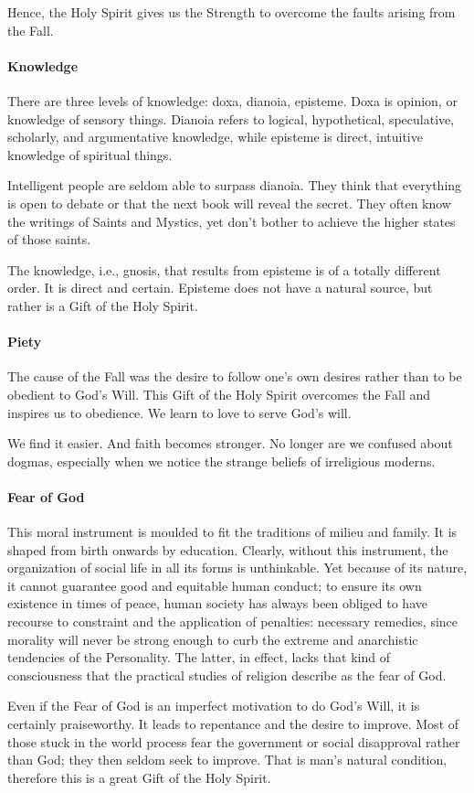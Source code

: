 Hence, the Holy Spirit gives us the Strength to overcome the faults arising from the Fall.

\paragraph{Knowledge}
There are three levels of knowledge: doxa, dianoia, episteme. Doxa is opinion, or knowledge of sensory things. Dianoia refers to logical, hypothetical, speculative, scholarly, and argumentative knowledge, while episteme is direct, intuitive knowledge of spiritual things.

Intelligent people are seldom able to surpass dianoia. They think that everything is open to debate or that the next book will reveal the secret. They often know the writings of Saints and Mystics, yet don't bother to achieve the higher states of those saints.

The knowledge, i.e., gnosis, that results from episteme is of a totally different order. It is direct and certain. Episteme does not have a natural source, but rather is a Gift of the Holy Spirit.

\paragraph{Piety}
The cause of the Fall was the desire to follow one's own desires rather than to be obedient to God's Will. This Gift of the Holy Spirit overcomes the Fall and inspires us to obedience. We learn to love to serve God's will.

We find it easier. And faith becomes stronger. No longer are we confused about dogmas, especially when we notice the strange beliefs of irreligious moderns.

\paragraph{Fear of God}
\begin{quotex}
This moral instrument is moulded to fit the traditions of milieu and family. It is shaped from birth onwards by education. Clearly, without this instrument, the organization of social life in all its forms is unthinkable. Yet because of its nature, it cannot guarantee good and equitable human conduct; to ensure its own existence in times of peace, human society has always been obliged to have recourse to constraint and the application of penalties: necessary remedies, since morality will never be strong enough to curb the extreme and anarchistic tendencies of the Personality. The latter, in effect, lacks that kind of consciousness that the practical studies of religion describe as the fear of God. 

\end{quotex}
Even if the Fear of God is an imperfect motivation to do God's Will, it is certainly praiseworthy. It leads to repentance and the desire to improve. Most of those stuck in the world process fear the government or social disapproval rather than God; they then seldom seek to improve. That is man's natural condition, therefore this is a great Gift of the Holy Spirit.


